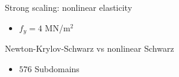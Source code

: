 \begin{frame}[noframenumbering]{Strong scaling: nonlinear elasticity}
	\begin{itemize}
		\item $f_y = 4$ MN/m$^{2}$
	\end{itemize}
	\begin{figure}
		\centering
		
		\label{fig:strong-scalability-elascticity}
	\end{figure}
\end{frame}

\begin{frame}[noframenumbering]{Newton-Krylov-Schwarz vs nonlinear Schwarz}
	\begin{itemize}
		\item $576$ Subdomains
	\end{itemize}
	\begin{figure}
		\centering
		
		\label{fig:nks-vs-nls}
	\end{figure}
\end{frame}


